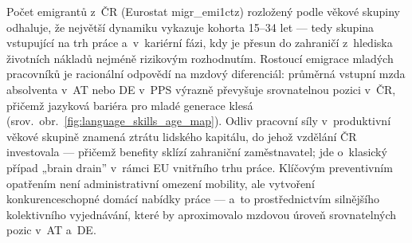 Počet emigrantů z~ČR (Eurostat migr\_emi1ctz) rozložený podle věkové skupiny odhaluje, že největší dynamiku vykazuje kohorta 15--34 let --- tedy skupina vstupující na trh práce a~v~kariérní fázi, kdy je přesun do zahraničí z~hlediska životních nákladů nejméně rizikovým rozhodnutím.
Rostoucí emigrace mladých pracovníků je racionální odpovědí na mzdový diferenciál: průměrná vstupní mzda absolventa v~AT nebo DE v~\ac{PPS} výrazně převyšuje srovnatelnou pozici v~ČR, přičemž jazyková bariéra pro mladé generace klesá (srov.~obr.~\ref{fig:language_skills_age_map}).
Odliv pracovní síly v~produktivní věkové skupině znamená ztrátu lidského kapitálu, do jehož vzdělání ČR investovala --- přičemž benefity sklízí zahraniční zaměstnavatel; jde o~klasický případ „brain drain” v~rámci \ac{EU} vnitřního trhu práce.
Klíčovým preventivním opatřením není administrativní omezení mobility, ale vytvoření konkurenceschopné domácí nabídky práce --- a~to prostřednictvím silnějšího kolektivního vyjednávání, které by aproximovalo mzdovou úroveň srovnatelných pozic v~AT a~DE.


